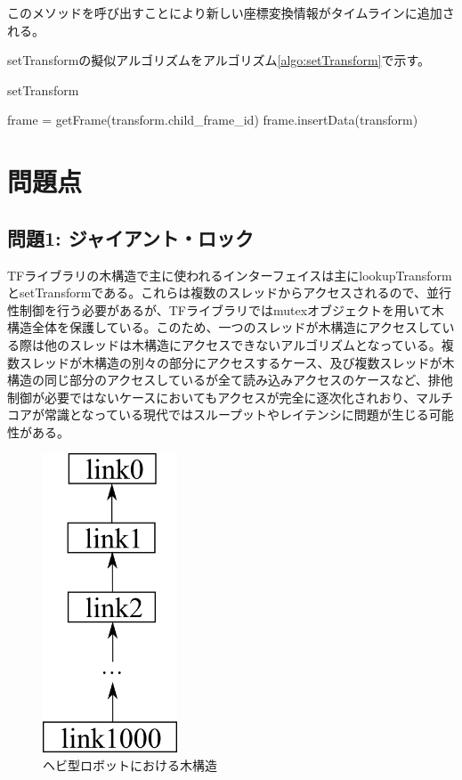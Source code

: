 \documentclass[a4paper]{jreport}	%
\begin{document}
このメソッドを呼び出すことにより新しい座標変換情報がタイムラインに追加される。

setTransformの擬似アルゴリズムをアルゴリズム\ref{algo:setTransform}で示す。


\begin{algorithm}
\caption{setTransform}\label{algo:setTransform}
\begin{algorithmic}[1]
	 
	\State frame = getFrame(transform.child\_frame\_id)
	\State frame.insertData(transform)
	\EndProcedure
\end{algorithmic}
\end{algorithm}

\section{問題点}
\subsection*{問題1: ジャイアント・ロック}
TFライブラリの木構造で主に使われるインターフェイスは主にlookupTransformとsetTransformである。これらは複数のスレッドからアクセスされるので、並行性制御を行う必要があるが、TFライブラリではmutexオブジェクトを用いて木構造全体を保護している。このため、一つのスレッドが木構造にアクセスしている際は他のスレッドは木構造にアクセスできないアルゴリズムとなっている。複数スレッドが木構造の別々の部分にアクセスするケース、及び複数スレッドが木構造の同じ部分のアクセスしているが全て読み込みアクセスのケースなど、排他制御が必要ではないケースにおいてもアクセスが完全に逐次化されおり、マルチコアが常識となっている現代ではスループットやレイテンシに問題が生じる可能性がある。

\begin{figure}[h] 
\centering
\includegraphics[width=4cm]{snake}	
\caption{ヘビ型ロボットにおける木構造}
\label{fig:snake}
\end{figure}
\end{document}
